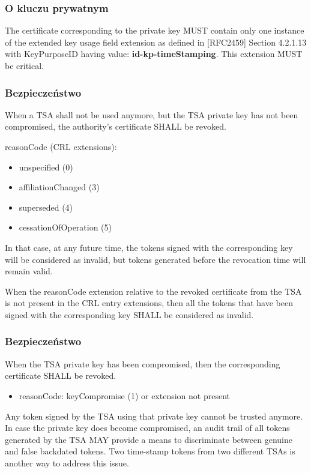\documentclass{beamer}
\begin{document}
\begin{frame}
	\frametitle{O kluczu prywatnym}  
	The certificate corresponding to the private key MUST contain only one instance of the extended key usage field extension as defined in [RFC2459] Section 4.2.1.13 with KeyPurposeID having value: \textbf{id-kp-timeStamping}.  This extension MUST be critical.
\end{frame}


\begin{frame}
	\frametitle{Bezpieczeństwo}
	  When a TSA shall not be used anymore, but the TSA private key has
      not been compromised, the authority's certificate SHALL be
      revoked.  
      
      reasonCode (CRL extensions):
      \begin{itemize}
      \item unspecified (0)
      \item affiliationChanged (3)
      \item superseded (4) 
      \item cessationOfOperation (5)
      \end{itemize}  In that case, at any
      future time, the tokens signed with the corresponding key will be
      considered as invalid, but tokens generated before the revocation
      time will remain valid.  
      
      When the reasonCode extension relative to
      the revoked certificate from the TSA is not present in the CRL
      entry extensions, then all the tokens that have been signed with
      the corresponding key SHALL be considered as invalid.
\end{frame}

\begin{frame}
	\frametitle{Bezpieczeństwo}
	  When the TSA private key has been compromised, then the
      corresponding certificate SHALL be revoked.  
      \begin{itemize}
	\item      reasonCode: keyCompromise (1) or extension not present
      \end{itemize}
      
      Any token signed by the TSA using that private key cannot be trusted
      anymore. In case the private key does become compromised, an audit trail of all tokens generated by the TSA MAY provide a means to discriminate between genuine and false backdated tokens.  Two time-stamp tokens from two different TSAs is another way to address this issue.
\end{frame}
\end{document}
